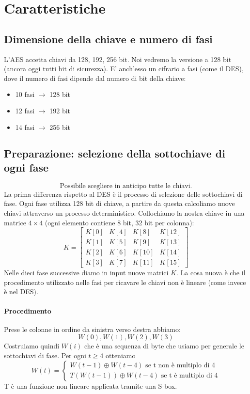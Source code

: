 \section{Caratteristiche}
\subsection{Dimensione della chiave e numero di fasi} L'AES accetta chiavi da 128, 192, 256 bit. Noi vedremo la versione a 128 bit (ancora oggi tutti bit di sicurezza). E' anch'esso un cifrario a fasi (come il DES), dove il numero di fasi dipende dal numero di bit della chiave:
\begin{itemize}
	\item 10 fasi $\xrightarrow{}$ 128 bit
	\item 12 fasi $\xrightarrow{}$ 192 bit
	\item 14 fasi $\xrightarrow{}$ 256 bit
\end{itemize}

\subsection{Preparazione: selezione della sottochiave di ogni fase}
\[\boxed{\text{Possibile scegliere in anticipo tutte le chiavi.}}\]
La prima differenza rispetto al DES è il processo di selezione delle sottochiavi di fase. Ogni fase utilizza 128 bit di chiave, a partire da questa calcoliamo nuove chiavi attraverso un processo deterministico. Collochiamo la nostra chiave in una matrice $4 \times 4$ (ogni elemento contiene 8 bit, 32 bit per colonna):
$$
K = 
    \begin{bmatrix}
        K[0] & K[4] & K[8] & K[12] \\
        K[1] & K[5] & K[9] & K[13] \\
        K[2] & K[6] & K[10] & K[14] \\
        K[3] & K[7] & K[11] & K[15]
    \end{bmatrix}
$$
\noindent Nelle dieci fase successive diamo in input nuove matrici $K$. La cosa nuova è che il procedimento utilizzato nelle fasi per ricavare le chiavi non è lineare (come invece è nel DES). 
\paragraph{Procedimento} Prese le colonne in ordine da sinistra verso destra abbiamo: 
$$W(0), W(1), W(2), W(3)$$
Costruiamo quindi $W(i)$ che è una sequenza di byte che usiamo per generale le sottochiavi di fase.
Per ogni $t \geq 4$ otteniamo
\[
    W(t) = 
    \begin{cases}
        W(t-1) \oplus W(t-4) \text{ se t non è multiplo di 4} \\
        T(W(t-1)) \oplus W(t-4) \text{ se t è multiplo di 4}
    \end{cases}
\]
T è una funzione non lineare applicata tramite una S-box.

